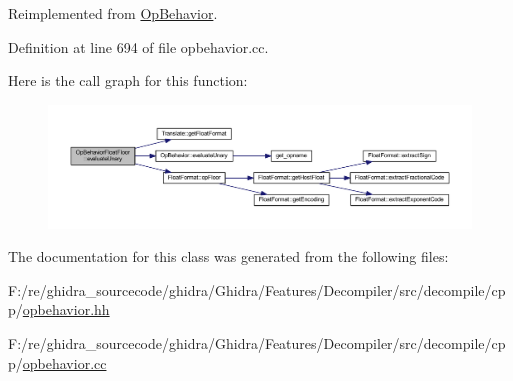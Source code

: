 Reimplemented from \mbox{\hyperlink{class_op_behavior_acd4f5a1c0dee0414f3c541620b88fe45}{Op\+Behavior}}.



Definition at line 694 of file opbehavior.\+cc.

Here is the call graph for this function\+:
\nopagebreak
\begin{figure}[H]
\begin{center}
\leavevmode
\includegraphics[width=350pt]{class_op_behavior_float_floor_adbb7f5d89cfeb64ce9319c1fc81955fa_cgraph}
\end{center}
\end{figure}


The documentation for this class was generated from the following files\+:\begin{DoxyCompactItemize}
\item 
F\+:/re/ghidra\+\_\+sourcecode/ghidra/\+Ghidra/\+Features/\+Decompiler/src/decompile/cpp/\mbox{\hyperlink{opbehavior_8hh}{opbehavior.\+hh}}\item 
F\+:/re/ghidra\+\_\+sourcecode/ghidra/\+Ghidra/\+Features/\+Decompiler/src/decompile/cpp/\mbox{\hyperlink{opbehavior_8cc}{opbehavior.\+cc}}\end{DoxyCompactItemize}
